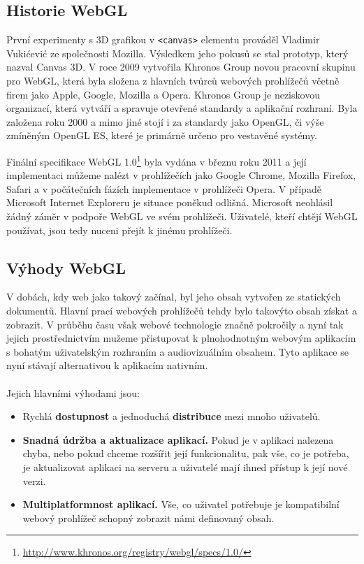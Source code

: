 \subsection*{Historie WebGL}
\label{subsection:historieWebGL}
První experimenty s 3D grafikou v \texttt{<canvas>} elementu prováděl Vladimir Vukićević ze společnosti Mozilla. Výsledkem jeho pokusů se stal prototyp, který nazval Canvas 3D. V roce 2009 vytvořila Khronos Group novou pracovní skupinu pro WebGL, která byla složena z hlavních tvůrců webových prohlížečů včetně firem jako Apple, Google, Mozilla a Opera. Khronos Group je neziskovou organizací, která vytváří a spravuje otevřené standardy a aplikační rozhraní. Byla založena roku 2000 a mimo jiné stojí i za standardy jako OpenGL, či výše zmíněným OpenGL ES, které je primárně určeno pro vestavěné systémy.~\cite{anyuru2012professional}

Finální specifikace WebGL 1.0\footnote{\url{http://www.khronos.org/registry/webgl/specs/1.0/}} byla vydána v březnu roku 2011 a její implementaci můžeme nalézt v prohlížečích jako Google Chrome, Mozilla Firefox, Safari a v počátečních fázích implementace v prohlížeči Opera. V případě Microsoft Internet Exploreru je situace poněkud odlišná. Microsoft neohlásil žádný záměr v podpoře WebGL ve svém prohlížeči. Uživatelé, kteří chtějí WebGL používat, jsou tedy nuceni přejít k jinému prohlížeči.~\cite{anyuru2012professional}

\subsection*{Výhody WebGL}
\label{subsection:vyhodyWebGL}
V dobách, kdy web jako takový začínal, byl jeho obsah vytvořen ze statických dokumentů. Hlavní prací webových prohlížečů tehdy bylo takovýto obsah získat a zobrazit. V průběhu času však webové technologie značně pokročily a nyní tak jejich prostřednictvím mužeme přistupovat k plnohodnotným webovým aplikacím s bohatým uživatelským rozhraním a audiovizuálním obsahem. Tyto aplikace se nyní stávají alternativou k aplikacím nativním.~\cite{anyuru2012professional} \\ \\
Jejich hlavními výhodami jsou:
\begin{itemize}
\item Rychlá \textbf{dostupnost} a jednoduchá \textbf{distribuce} mezi mnoho uživatelů.
\item \textbf{Snadná údržba a aktualizace aplikací.} Pokud je v aplikaci nalezena chyba, nebo pokud chceme rozšířit její funkcionalitu, pak vše, co je potřeba, je aktualizovat aplikaci na serveru a uživatelé mají ihned přístup k její nové verzi.
\item \textbf{Multiplatformnost aplikací.} Vše, co uživatel potřebuje je kompatibilní webový prohlížeč schopný zobrazit námi definovaný obsah.
\end{itemize}

